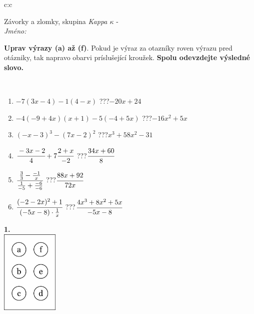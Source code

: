\documentclass[10pt]{report}
\begin{document}
\begin{tabular}{c:c}
\begin{minipage}[c][104.5mm][t]{0.5\linewidth}
\begin{center}
\vspace{7mm}
{\huge Závorky a zlomky, skupina \textit{Kappa $\kappa$} -}\\[5mm]
\textit{Jméno:}\phantom{xxxxxxxxxxxxxxxxxxxxxxxxxxxxxxxxxxxxxxxxxxxxxxxxxxxxxxxxxxxxxxxxx}\\[5mm]
\begin{minipage}{0.95\linewidth}
\begin{center}
\textbf{Uprav výrazy (a) až (f)}. Pokud je výraz za otazníky roven výrazu pred otázniky, tak napravo obarvi príslušející kroužek. \textbf{Spolu odevzdejte výsledné slovo.}
\end{center}
\end{minipage}
\\[1mm]
\begin{minipage}{0.79\linewidth}
\begin{center}
\begin{varwidth}{\linewidth}
\begin{enumerate}
\normalsize
\item $-7(3x-4)-1(4-x)$\quad \dotfill\; ???\;\dotfill \quad $-20x+24$
\item $-4(-9+4x)(x+1)-5(-4+5x)$\quad \dotfill\; ???\;\dotfill \quad $-16x^2+5x$
\item $(-x-3)^3-(7x-2)^2$\quad \dotfill\; ???\;\dotfill \quad $x^3+58x^2-31$
\item $\cfrac{-3x-2}{4}+7\cfrac{2+x}{-2}$\quad \dotfill\; ???\;\dotfill \quad $\cfrac{34x+60}{8}$
\item $\cfrac{\frac{3}{3}-\frac{-1}{x}}{\frac{1}{-5}+\frac{-6}{-6}}$\quad \dotfill\; ???\;\dotfill \quad $\cfrac{88x+92}{72x}$
\item $\cfrac{(-2-2x)^2+1}{(-5x-8)\cdot\frac{1}{x}}$\quad \dotfill\; ???\;\dotfill \quad $\cfrac{4x^3+8x^2+5x}{-5x-8}$
\end{enumerate}
\end{varwidth}
\end{center}
\end{minipage}
\begin{minipage}{0.20\linewidth}
\begin{center}
{\Huge\bfseries 1.} \\[2mm]
\includegraphics[height=40mm]{../images/braille.png}

\end{center}
\end{minipage}
\end{center}
\end{minipage}
\end{tabular}
\end{document}
